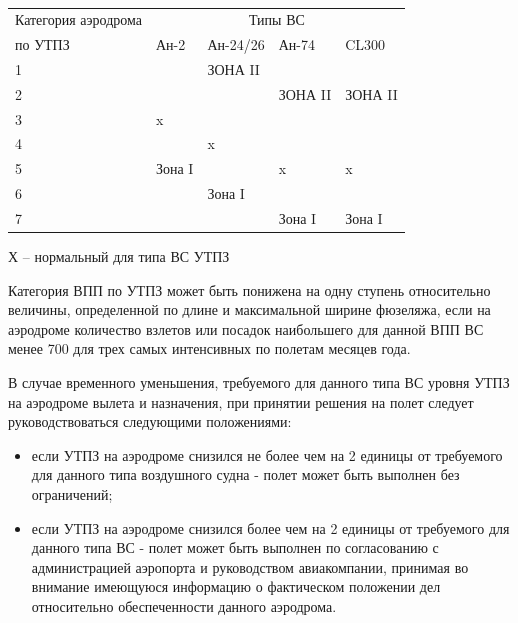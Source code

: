 \begin{table}[H]
    \begin{center}
    \caption{} \label{tbl:04T5}
    \small
    \begin{tabular}{|p{}|p{}|p{}|p{}|p{}|}
    \hline
    Категория аэродрома  &\multicolumn{4}{c|}{Типы ВС} \\
    \cline{2-5}
    по УТПЗ                     &Ан-2   &Ан-24/26   &Ан-74  &CL300\\
    \hline    
    1                           &       &  ЗОНА II  &       &       \\\hline
    2                           &       &           &ЗОНА II&ЗОНА II\\\hline
    3                           &x      &           &       &       \\\hline
    4                           &       &x          &       &       \\\hline
    5                           &Зона I &           &x      &x      \\\hline
    6                           &       &Зона I     &       &       \\\hline
    7                           &       &           &Зона I &Зона I \\
    \hline\hline
    \end{tabular}
    \end{center}
\end{table}
Х – нормальный для типа ВС УТПЗ

Категория ВПП по УТПЗ может быть понижена на одну ступень относительно величины, определенной по длине и максимальной ширине фюзеляжа, если на аэродроме количество взлетов или посадок наибольшего для данной ВПП ВС менее 700 для трех самых интенсивных по полетам месяцев года.

В случае временного уменьшения, требуемого для данного типа ВС уровня УТПЗ на аэродроме вылета и назначения, при принятии решения на полет следует руководствоваться следующими положениями:
\begin{itemize}
    \item если УТПЗ на аэродроме снизился не более чем на 2 единицы от требуемого для данного типа воздушного судна - полет может быть выполнен без ограничений;
    \item если УТПЗ на аэродроме снизился более чем на 2 единицы от требуемого для данного типа ВС - полет может быть выполнен по согласованию с администрацией аэропорта и руководством авиакомпании, принимая во внимание имеющуюся информацию о фактическом положении дел относительно обеспеченности данного аэродрома.
\end{itemize}

